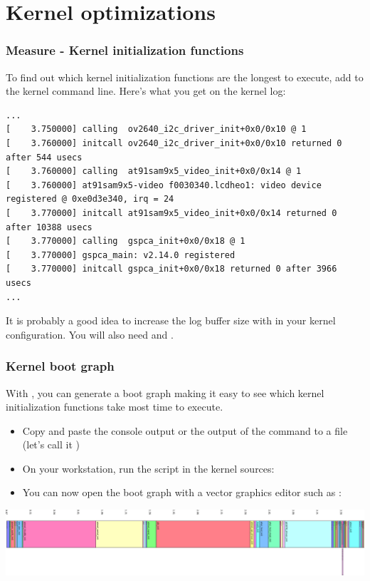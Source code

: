 \section{Kernel optimizations}

\begin{frame}[fragile]
\frametitle{Measure - Kernel initialization functions}
To find out which kernel initialization functions are the longest to
execute, add  to the kernel command line.
Here's what you get on the kernel log:
\begin{block}{}
\tiny
\begin{verbatim}
...
[    3.750000] calling  ov2640_i2c_driver_init+0x0/0x10 @ 1
[    3.760000] initcall ov2640_i2c_driver_init+0x0/0x10 returned 0 after 544 usecs
[    3.760000] calling  at91sam9x5_video_init+0x0/0x14 @ 1
[    3.760000] at91sam9x5-video f0030340.lcdheo1: video device registered @ 0xe0d3e340, irq = 24
[    3.770000] initcall at91sam9x5_video_init+0x0/0x14 returned 0 after 10388 usecs
[    3.770000] calling  gspca_init+0x0/0x18 @ 1
[    3.770000] gspca_main: v2.14.0 registered
[    3.770000] initcall gspca_init+0x0/0x18 returned 0 after 3966 usecs
...
\end{verbatim}
\end{block}
It is probably a good idea to increase the log buffer size with
 in your kernel configuration. You will
also need  and .
\end{frame}

\begin{frame}
\frametitle{Kernel boot graph}
With , you can generate a boot graph
making it easy to see which kernel initialization functions
take most time to execute.
\begin{itemize}
\item Copy and paste the console output or the output of
      the  command to a file (let's call it )
\item On your workstation, run the  script
      in the kernel sources: \\
\item You can now open the boot graph with a vector graphics
      editor such as :
\end{itemize}
\begin{center}
    \includegraphics[width=\textwidth]{slides/boottime-kernel/boot.png}
\end{center}
\end{frame}

